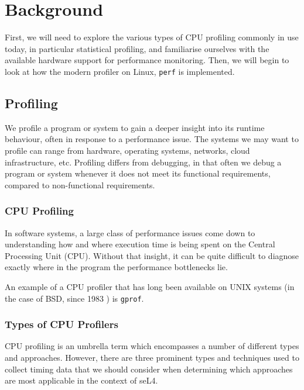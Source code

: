 \chapter{Background}\label{ch:background}

First, we will need to explore the various types of CPU profiling commonly in use today, in particular statistical profiling, and familiarise ourselves with the available hardware support for performance monitoring. Then, we will begin to look at how the modern profiler on Linux, \texttt{perf} is implemented.

\section{Profiling}

We profile a program or system to gain a deeper insight into its runtime behaviour, often in response to a performance issue. The systems we may want to profile can range from hardware, operating systems, networks, cloud infrastructure, etc. Profiling differs from debugging, in that often we debug a program or system whenever it does not meet its functional requirements, compared to non-functional requirements.

\subsection{CPU Profiling}

In software systems, a large class of performance issues come down to understanding how and where execution time is being spent on the Central Processing Unit (CPU). Without that insight, it can be quite difficult to diagnose exactly where in the program the performance bottlenecks lie.

An example of a CPU profiler that has long been available on UNIX systems (in the case of BSD, since 1983 \cite{ManGprof}) is \texttt{gprof}.

\subsection{Types of CPU Profilers}\label{sect:cpu_profiler_types}

CPU profiling is an umbrella term which encompasses a number of different types and approaches. However, there are three prominent types and techniques used to collect timing data that we should consider when determining which approaches are most applicable in the context of seL4.

